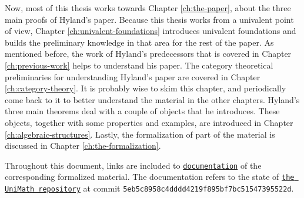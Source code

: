 Now, most of this thesis works towards Chapter \ref{ch:the-paper}, about the three main proofs of Hyland's paper.
Because this thesis works from a univalent point of view, Chapter \ref{ch:univalent-foundations} introduces univalent foundations and builds the preliminary knowledge in that area for the rest of the paper.
As mentioned before, the work of Hyland's predecessors that is covered in Chapter \ref{ch:previous-work} helps to understand his paper.
The category theoretical preliminaries for understanding Hyland's paper are covered in Chapter \ref{ch:category-theory}. It is probably wise to skim this chapter, and periodically come back to it to better understand the material in the other chapters.
Hyland's three main theorems deal with a couple of objects that he introduces. These objects, together with some properties and examples, are introduced in Chapter \ref{ch:algebraic-structures}.
Lastly, the formalization of part of the material is discussed in Chapter \ref{ch:the-formalization}.

Throughout this document, links are included to \href{https://arnoudvanderleer.github.io/cs-masters-thesis/toc.html}{\nolinkurl{documentation}} of the corresponding formalized material. The documentation refers to the state of \href{https://github.com/UniMath/UniMath/tree/5eb5c8958c4dddd4219f895bf7bc51547395522d}{\texttt{the UniMath repository}} at commit \texttt{5eb5c8958c4dddd4219f895bf7bc51547395522d}.
